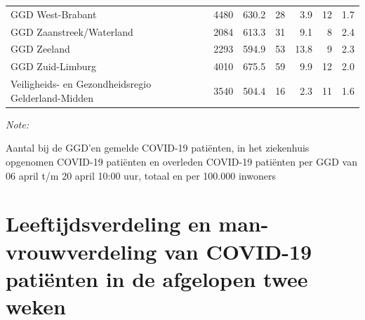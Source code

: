 \documentclass[
  english,
  man,floatsintext]{apa6}
\begin{document}
\begin{table}
\begin{threeparttable}
\begin{tabular}{lrrrrrr}
GGD West-Brabant & 4480 & 630.2 & 28 & 3.9 & 12 & 1.7\\
GGD Zaanstreek/Waterland & 2084 & 613.3 & 31 & 9.1 & 8 & 2.4\\
GGD Zeeland & 2293 & 594.9 & 53 & 13.8 & 9 & 2.3\\
GGD Zuid-Limburg & 4010 & 675.5 & 59 & 9.9 & 12 & 2.0\\
Veiligheids- en Gezondheidsregio Gelderland-Midden & 3540 & 504.4 & 16 & 2.3 & 11 & 1.6\\
\bottomrule
\end{tabular}
\begin{tablenotes}
\item \textit{Note: } 
\item Aantal bij de GGD’en gemelde COVID-19 patiënten, in het ziekenhuis opgenomen COVID-19 patiënten en overleden COVID-19 patiënten per GGD van 06 april t/m 20 april 10:00 uur, totaal en per 100.000 inwoners
\end{tablenotes}
\end{threeparttable}
\endgroup{}
\end{table}

\newpage

\hypertarget{leeftijdsverdeling-en-man-vrouwverdeling-van-covid-19-patiuxebnten-in-de-afgelopen-twee-weken}{%
\section{Leeftijdsverdeling en man-vrouwverdeling van COVID-19 patiënten in de afgelopen twee weken}\label{leeftijdsverdeling-en-man-vrouwverdeling-van-covid-19-patiuxebnten-in-de-afgelopen-twee-weken}}
\end{document}
